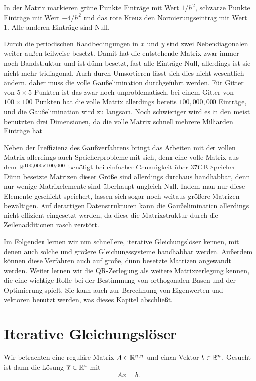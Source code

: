 In der Matrix markieren grüne Punkte Einträge mit Wert $1/h^2$,
schwarze Punkte Einträge mit Wert $-4/h^2$ und das rote Kreuz den
Normierungseintrag mit Wert 1. Alle anderen Einträge sind Null.

Durch die periodischen Randbedingungen in $x$ und $y$ sind zwei
Nebendiagonalen weiter außen teilweise besetzt. Damit hat die
entstehende Matrix zwar immer noch Bandstruktur und ist dünn
besetzt, \dh fast alle Einträge Null, allerdings ist sie nicht mehr
tridiagonal. Auch durch Umsortieren lässt sich dies nicht wesentlich
ändern, daher muss die volle Gaußelimination durchgeführt werden. Für
Gitter von $5\times 5$ Punkten ist das zwar noch unproblematisch, bei
einem Gitter von $100\times 100$ Punkten hat die volle Matrix
allerdings bereits $100,000,000$ Einträge, und die Gaußelimination
wird zu langsam. Noch schwieriger wird es in den meist benutzten
drei Dimensionen, da die volle Matrix schnell mehrere Milliarden
Einträge hat.

Neben der Ineffizienz des Gaußverfahrens bringt das Arbeiten mit der
vollen Matrix allerdings auch Speicherprobleme mit sich, denn eine
volle Matrix aus dem $\mathbb{R}^{100,000\times 100,000}$ benötigt bei
einfacher Genauigkeit über 37GB Speicher. Dünn besetzte Matrizen
dieser Größe sind allerdings durchaus handhabbar, denn nur wenige
Matrixelemente sind überhaupt ungleich Null. Indem man nur diese
Elemente geschickt speichert, lassen sich sogar noch weitaus größere
Matrizen bewältigen. Auf derartigen Datenstrukturen kann die
Gaußelimination allerdings nicht effizient eingesetzt werden, da diese
die Matrixstruktur durch die Zeilenadditionen rasch zerstört.

Im Folgenden lernen wir nun schnellere, iterative Gleichungslöser
kennen, mit denen auch solche und größere Gleichungssysteme handhabbar
werden. Außerdem können diese Verfahren auch auf große, dünn besetzte
Matrizen angewandt werden. Weiter lernen wir die QR-Zerlegung als
weitere Matrixzerlegung kennen, die eine wichtige Rolle bei der
Bestimmung von orthogonalen Basen und der 
Optimierung spielt. Sie kann auch zur Berechnung von Eigenwerten und
-vektoren benutzt werden, was dieses Kapitel abschließt.

\section{Iterative Gleichungslöser}

Wir betrachten eine reguläre Matrix $A\in\mathbb{R}^{n,n}$ und einen Vektor
$b\in\mathbb{R}^n$. Gesucht ist dann die Lösung $\overline{x}\in\mathbb{R}^n$ mit
\begin{equation}
  \label{eq:axb}
  A\overline{x} = b.
\end{equation}

